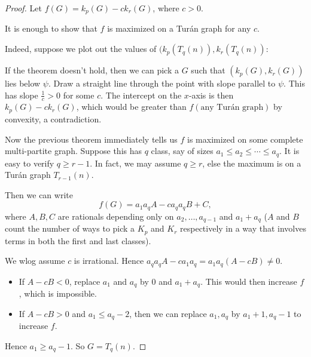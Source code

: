 \documentclass[a4paper]{article}
\begin{document}
\begin{proof}
  Let $f(G) = k_p(G) - c k_r(G)$, where $c > 0$.
  \begin{claim}
    It is enough to show that $f$ is maximized on a Tur\'an graph for any $c$.
  \end{claim}
  Indeed, suppose we plot out the values of $(k_p(T_q(n)), k_r(T_q(n))$:
  \begin{center}
  \end{center}

  If the theorem doesn't hold, then we can pick a $G$ such that $(k_p(G), k_r(G))$ lies below $\psi$. Draw a straight line through the point with slope parallel to $\psi$. This has slope $\frac{1}{c} > 0$ for some $c$. The intercept on the $x$-axis is then $k_p(G) - c k_r(G)$, which would be greater than $f(\text{any Tur\'an graph})$ by convexity, a contradiction.

  Now the previous theorem immediately tells us $f$ is maximized on some complete multi-partite graph. Suppose this has $q$ class, say of sizes $a_1 \leq a_2 \leq \cdots \leq a_q$. It is easy to verify $q \geq r - 1$. In fact, we may assume $q \geq r$, else the maximum is on a Tur\'an graph $T_{r - 1}(n)$.

  Then we can write
  \[
    f(G) = a_1 a_q A - c a_q a_q B + C,
  \]
  where $A, B, C$ are rationals depending only on $a_2, \ldots, a_{q - 1}$ and $a_1 + a_q$ ($A$ and $B$ count the number of ways to pick a $K_p$ and $K_r$ respectively in a way that involves terms in both the first and last classes).

  We wlog assume $c$ is irrational. Hence $a_q a_q A - c a_1 a_q = a_1 a_q (A - cB) \not= 0$.
  \begin{itemize}
    \item If $A - cB < 0$, replace $a_1$ and $a_q$ by $0$ and $a_1 + a_q$. This would then increase $f$, which is impossible.
    \item If $A - cB > 0$ and $a_1 \leq a_q - 2$, then we can replace $a_1, a_q$ by $a_1 + 1, a_q - 1$ to increase $f$.
  \end{itemize}
  Hence $a_1 \geq a_q - 1$. So $G = T_q(n)$.
\end{proof}
\end{document}
